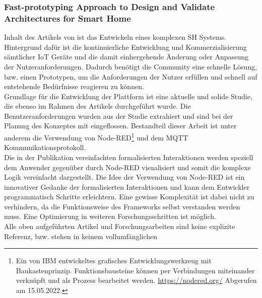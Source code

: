         \subsubsection*{Fast-prototyping Approach to Design and Validate Architectures for Smart Home}  
            Inhalt des Artikels von \cite{Montanaro2021} ist das Entwickeln eines komplexen \acl{SH} Systems. 
            Hintergrund dafür ist die kontinuierliche Entwicklung und Kommerzialisierung sämtlicher \acs{IoT} Geräte und 
            die damit einhergehende Änderung oder Anpassung der Nutzeranforderungen. Dadurch benötigt die Community eine 
            schnelle Lösung, bzw. einen Prototypen, um die Anforderungen der Nutzer erfüllen und schnell auf 
            entstehende Bedürfnisse reagieren zu können. 
            \\
            Grundlage für die Entwicklung der Plattform ist eine aktuelle und solide Studie, die ebenso im Rahmen des 
            Artikels durchgeführt wurde. Die Benutzeranforderungen wurden aus der Studie extrahiert und sind bei der 
            Planung des Konzeptes mit eingeflossen. Bestandteil dieser Arbeit ist unter anderem die Verwendung von Node-RED\footnote{Ein von IBM entwickeltes grafisches Entwicklungswerkzeug mit Baukastenprinzip. Funktionsbausteine können per Verbindungen miteinander verknüpft und als Prozess bearbeitet werden. \url{https://nodered.org/} Abgerufen am 15.05.2022.} und 
            dem \acs{MQTT} Kommunikationsprotokoll. 
            \\
            \linebreak
            Die in der Publikation vereinfachten formalisierten Interaktionen werden speziell dem Anwender gegenüber durch 
            Node-RED visualisiert und somit die komplexe Logik vereinfacht dargestellt. Die Idee der Verwendung von Node-RED 
            ist ein innovativer Gedanke der formalisierten Interaktionen und kann dem Entwickler programmatisch Schritte 
            erleichtern. Eine gewisse Komplexität ist dabei nicht zu verhindern, da die Funktionsweise des Frameworks selbst 
            verstanden werden muss.  
            Eine Optimierung in weiteren Forschungsschritten ist möglich.
    \\
    \linebreak
    Alle oben aufgeführten Artikel und Forschungsarbeiten sind keine explizite Referenz, bzw. stehen in keinem vollumfänglichen 

